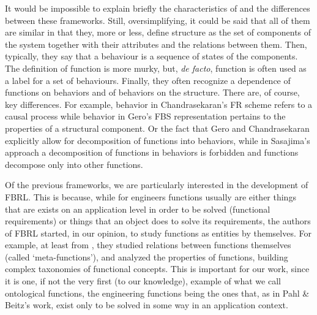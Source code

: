 \documentclass[sw]{iosart2x}
\newcommand{\quotes}[1]{`#1'}
\begin{document}
It would be impossible to explain briefly the characteristics of and the differences between these frameworks. Still, oversimplifying, it could be said that all of them are similar in that they, more or less, define structure as the set of components of the system together with their attributes and the relations between them. Then, typically, they say that a behaviour is a sequence of states of the components. The definition of function is more murky, but, \textit{de facto}, function is often used as a label for a set of behaviours. Finally, they often recognize a dependence of functions on behaviors and of behaviors on the structure. 
There are, of course, key differences. 
For example, behavior in Chandrasekaran’s FR scheme refers to a causal process while behavior in Gero’s FBS representation pertains to the properties of a structural component.
Or the fact that Gero and Chandrasekaran explicitly allow for decomposition of functions into behaviors, while in Sasajima's approach a decomposition of functions in behaviors is forbidden and functions decompose only into other functions.  

Of the previous frameworks, we are particularly interested in the development of FBRL. 
This is because, while for engineers functions usually are either things that are exists on an application level in order to be solved (functional requirements) or things that an object does to solve its requirements, the authors of FBRL started, in our opinion, to study functions as entities by themselves. 
For example, at least from \cite{kitamuraMetaFunctionsArtifacts1999}, they studied relations between functions themselves (called \quotes{meta-functions}), and analyzed the properties of functions, building complex taxonomies of functional concepts.
This is important for our work, since it is one, if not the very first (to our knowledge), example of what we call ontological functions, the engineering functions being the ones that, as in Pahl \& Beitz's work, exist only to be solved in some way in an application context.
\end{document}
